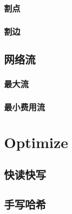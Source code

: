 \documentclass[10pt,a4paper]{article}
\begin{document}
\subsubsection{割点}

\subsubsection{割边}

\subsection{网络流}
\subsubsection{最大流}

\subsubsection{最小费用流}

\section{Optimize}
\subsection{快读快写}

\subsection{手写哈希}

\end{document}
